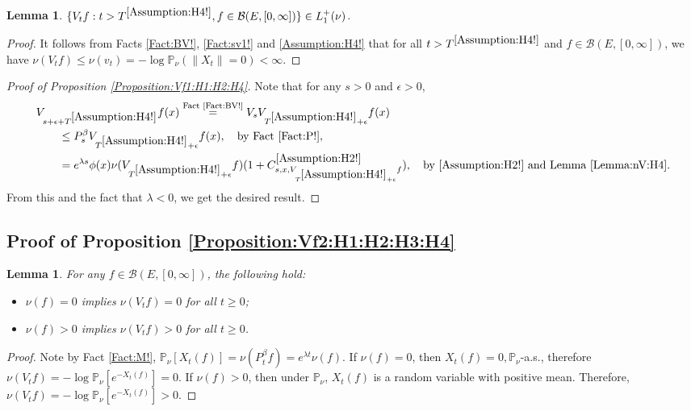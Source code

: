 \documentclass[12pt,a4paper]{amsart}
\numberwithin{equation}{section}
\theoremstyle{plain}
\newtheorem{lem}[thm]{Lemma}
\theoremstyle{definition}
\theoremstyle{remark}
\newcounter{N}
\newcounter{n}[N]
\begin{document}
\begin{lem} \label{Lemma:nV:H4}
	$\{V_tf:t> T^{\ref{Assumption:H4!}}, f\in \mathcal B(E, [0,\infty])\}\in L_1^+(\nu)$.
\end{lem}

\begin{proof}
It follows from Facts \ref{Fact:BV!}, \ref{Fact:sv1!} and \ref{Assumption:H4!} that for  all $t> T^{\ref{Assumption:H4!}}$ and $f\in \mathcal B(E,[0,\infty])$, we have $\nu(V_t f) \leq \nu(v_t)   = - \log \mathbb P_\nu (\|X_t\| = 0)  < \infty. $
\end{proof}

\begin{proof}[{Proof of Proposition \ref{Proposition:Vf1:H1:H2:H4}}]
Note that for any $s>0$ and $\epsilon>0$,
\begin{align}
\MoveEqLeft V_{s+\epsilon +T^{\ref{Assumption:H4!}}} f (x)\overset{\text{Fact \ref{Fact:BV!}}} = V_s V_{T^{\ref{Assumption:H4!}}+\epsilon} f(x)
\\&\leq P_s^\beta V_{T^{\ref{Assumption:H4!}} + \epsilon} f(x),\quad\text{by Fact \ref{Fact:P!}},
 \\&= e^{\lambda s}\phi(x) \nu( V_{T^{\ref{Assumption:H4!}} +\epsilon} f)  (1+ C^{\ref{Assumption:H2!}}_{s,x,V_{T^{\ref{Assumption:H4!}} + \epsilon} f}),\quad\text{by \ref{Assumption:H2!} and Lemma \ref{Lemma:nV:H4}}.
 \end{align}
 From this and the fact that $\lambda < 0$, we get the desired result.
\end{proof}
\subsection{Proof of Proposition \ref{Proposition:Vf2:H1:H2:H3:H4}} \label{sec:Vf2}

\begin{lem} \label{Lemma:nVn!}
For any $f\in \mathcal B(E,[0,\infty])$, the following hold:
\begin{itemize}
\item
	$\nu(f) = 0$ implies $\nu(V_tf)=0$ for all $t\ge 0$;
\item
	$\nu(f)>0$ implies $\nu(V_tf)>0$ for all $t\ge 0$.
\end{itemize}
\end{lem}

\begin{proof}
	Note by Fact \ref{Fact:M!}, $ \mathbb P_\nu[X_t(f)] = \nu (P_t^\beta f) = e^{\lambda t}\nu (f). $
	If $\nu(f) = 0$, then $X_t(f)=0, \mathbb P_\nu$-a.s., therefore $\nu(V_t f) = - \log \mathbb P_\nu[e^{-X_t(f)}] =0. $
	If $\nu(f) > 0$, then under $\mathbb P_\nu$, $X_t(f)$ is a random variable with positive mean.
	Therefore, $ \nu(V_tf) = - \log \mathbb P_\nu[e^{-X_t(f)}] >0$.
\end{proof}
\end{document}
